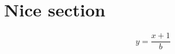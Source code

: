 \documentclass{article}
\begin{document}
\section{Nice section \label{sec:nice}}
\begin{equation}
     y=\frac{x+1}{b} \label{niceeq}
\end{equation}
\end{document}
